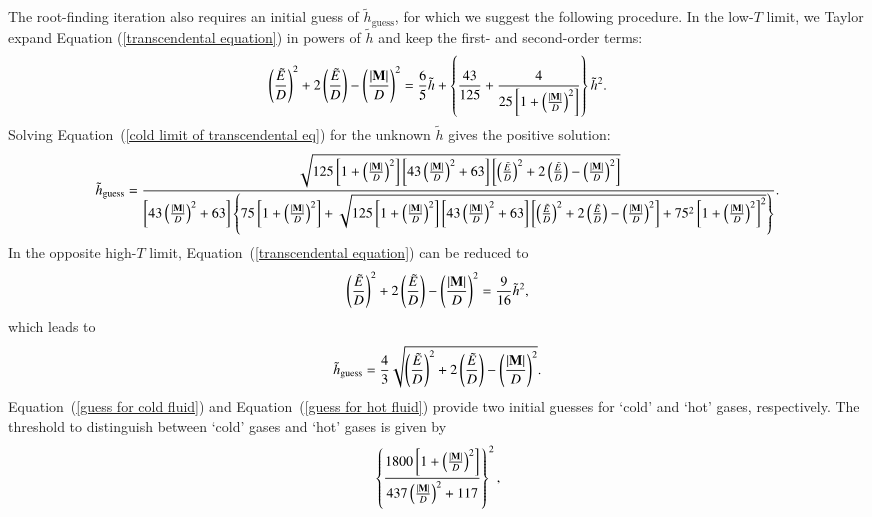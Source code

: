 \documentclass[twocolumn]{aastex63}
\begin{document}
The root-finding iteration also requires an initial guess of $\tilde{h}_{\text{guess}}$, for which we suggest the following procedure. In the low-$T$ limit, we Taylor expand Equation (\ref{transcendental equation}) in powers of $\tilde{h}$ and keep the first- and second-order terms:
\begin{equation}
\left(\frac{\tilde{E}}{D}\right)^2+2\left(\frac{\tilde{E}}{D}\right)-\left(\frac{\abs{\mathbf{M}}}{D}\right)^2
=\frac{6}{5}\tilde{h}+\left\{\frac{43}{125}+\frac{4}{25\left[1+\left(\frac{\abs{\mathbf{M}}}{D}\right)^2\right]}\right\}\tilde{h}^2.
\label{cold limit of transcendental eq}
\end{equation}
Solving Equation~(\ref{cold limit of transcendental eq}) for the unknown $\tilde{h}$ gives the positive solution:
\begin{equation}
\tilde{h}_{\text{guess}}
=\frac{
\sqrt{125\left[1+\left(\frac{\abs{\mathbf{M}}}{D}\right)^2\right]\left[43\left(\frac{\abs{\mathbf{M}}}{D}\right)^2+63\right]\left[\left(\frac{\tilde{E}}{D}\right)^2+2\left(\frac{\tilde{E}}{D}\right)-\left(\frac{\abs{\mathbf{M}}}{D}\right)^2\right]}}
{\left[43\left(\frac{\abs{\mathbf{M}}}{D}\right)^2+63\right]\left\{75\left[1+\left(\frac{\abs{\mathbf{M}}}{D}\right)^2\right]+\sqrt{125\left[1+\left(\frac{\abs{\mathbf{M}}}{D}\right)^2\right]\left[43\left(\frac{\abs{\mathbf{M}}}{D}\right)^2+63\right]\left[\left(\frac{\tilde{E}}{D}\right)^2+2\left(\frac{\tilde{E}}{D}\right)-\left(\frac{\abs{\mathbf{M}}}{D}\right)^2\right]+75^2\left[1+\left(\frac{\abs{\mathbf{M}}}{D}\right)^2\right]^2}\right\}}.
\label{guess for cold fluid}
\end{equation} In the opposite high-$T$ limit, Equation~(\ref{transcendental equation}) can be reduced to
\begin{equation}
\left(\frac{\tilde{E}}{D}\right)^2+2\left(\frac{\tilde{E}}{D}\right)-\left(\frac{\abs{\mathbf{M}}}{D}\right)^2
=\frac{9}{16}\tilde{h}^2,
\label{hot limit of transcendental eq}
\end{equation}
which leads to
\begin{equation}
\tilde{h}_{\text{guess}}=
\frac{4}{3}\sqrt{\left(\frac{\tilde{E}}{D}\right)^2+2\left(\frac{\tilde{E}}{D}\right)-\left(\frac{\abs{\mathbf{M}}}{D}\right)^2}.
\label{guess for hot fluid}
\end{equation}
Equation~(\ref{guess for cold fluid}) and Equation~(\ref{guess for hot fluid}) provide two initial guesses for `cold' and `hot' gases, respectively. The threshold to distinguish between `cold' gases and `hot' gases is given by
\begin{equation}
\left\{\frac{1800\left[1+\left(\frac{\abs{\mathbf{M}}}{D}\right)^2\right]}{437\left(\frac{\abs{\mathbf{M}}}{D}\right)^2+117}\right\}^2,
\label{ColdHot}
\end{equation}
\end{document}
